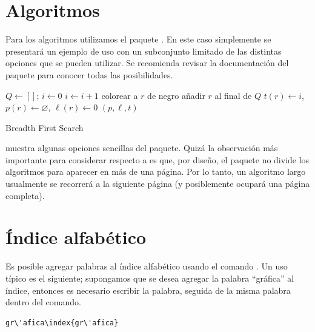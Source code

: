 \section{Algoritmos}

Para los algoritmos utilizamos el paquete \href{https://www.ctan.org/pkg/%
algorithm2e}{}.   En este caso simplemente
se presentar\'a un ejemplo de uso con un subconjunto limitado de las distintas
opciones que se pueden utilizar.   Se recomienda revisar la documentaci\'on del
paquete para conocer todas las posibilidades.

\begin{algorithm}[ht!]
 \DontPrintSemicolon

   \BlankLine $Q \leftarrow []$; $i \leftarrow 0$\; $i \leftarrow i+1$\;
  colorear a $r$ de negro\; a\~nadir $r$ al final de $Q$\; $t(r) \leftarrow i$,
  $p(r) \leftarrow \varnothing$, $\ell (r) \leftarrow 0$\; { } {\Return $(p,\ell,t)$}
  \caption{Breadth First Search}
  \label{alg:bfs}
\DecMargin{1em}
\end{algorithm}

 muestra algunas opciones sencillas del paquete.   Quiz\'a la
observaci\'on m\'as importante para considerar respecto a  es
que, por dise\~no, el paquete no divide los algoritmos para aparecer en m\'as de
una p\'agina.   Por lo tanto, un algoritmo largo usualmente se recorrer\'a a la
siguiente p\'agina (y posiblemente ocupar\'a una p\'agina completa).

\section{\'Indice alfab\'etico}
\label{sec:indice}

Es posible agregar palabras al \'indice alfab\'etico
usando el comando .   Un uso t\'ipico es el
siguiente; supongamos que se desea agregar la palabra ``gr\'afica'' al \'indice,
entonces es necesario escribir la palabra, seguida de la misma palabra dentro
del comando.
\begin{lstlisting}
gr\'afica\index{gr\'afica}
\end{lstlisting}

